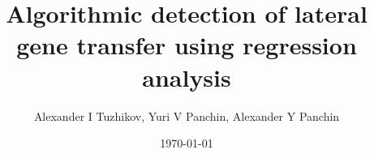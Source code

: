 \title{Algorithmic detection of lateral gene transfer using regression
analysis}
\author{Alexander I Tuzhikov, Yuri V Panchin, Alexander Y Panchin}
\date{\today}
